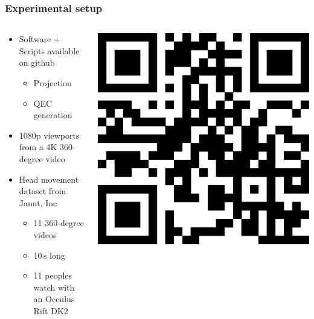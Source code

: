 \begin{frame}[c]
   \frametitle{Experimental setup}

   \begin{columns}[T]
     \begin{column}{0.65\linewidth}
        \begin{itemize}[<+->]
            \item Software + Scripts available on github
            \begin{itemize}[<.->]
               \item Projection
               \item QEC generation
            \end{itemize}
            \item 1080p viewports from a 4K 360-degree video
            \item Head movement dataset from Jaunt, Inc
            \begin{itemize}[<.->]
               \item 11 360-degree videos
               \item 10\,s long
               \item 11 peoples watch with an Occulus Rift DK2
            \end{itemize}
         \end{itemize}
      \end{column}
      \begin{column}{0.35\linewidth}
         \includegraphics[scale=0.25]{plots/pictures/Xavier/githubQRC.eps}
      \end{column}
   \end{columns}

\end{frame}

